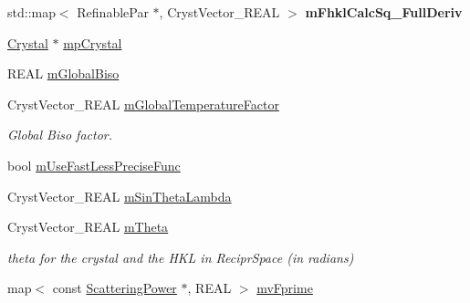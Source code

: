 \begin{DoxyCompactItemize}
\mbox{\label{class_obj_cryst_1_1_scattering_data_a7a245e07904bf0d9abdd96e2435d66ed}} 
std\+::map$<$ Refinable\+Par $\ast$, Cryst\+Vector\+\_\+\+R\+E\+AL $>$ {\bfseries m\+Fhkl\+Calc\+Sq\+\_\+\+Full\+Deriv}
\item 
\mbox{\hyperlink{class_obj_cryst_1_1_crystal}{Crystal}} $\ast$ \mbox{\hyperlink{class_obj_cryst_1_1_scattering_data_a8c4e778a97e93098d585ffdc597dbb54}{mp\+Crystal}}
\item 
R\+E\+AL \mbox{\hyperlink{class_obj_cryst_1_1_scattering_data_a15f71120c0eabe7b1bd768663a176752}{m\+Global\+Biso}}
\item 
\mbox{\label{class_obj_cryst_1_1_scattering_data_af12d3e0312ba9dc9488ca1db7f35be56}} 
Cryst\+Vector\+\_\+\+R\+E\+AL \mbox{\hyperlink{class_obj_cryst_1_1_scattering_data_af12d3e0312ba9dc9488ca1db7f35be56}{m\+Global\+Temperature\+Factor}}
\begin{DoxyCompactList}\small\item\em Global Biso factor. \end{DoxyCompactList}\item 
bool \mbox{\hyperlink{class_obj_cryst_1_1_scattering_data_a7a3fa9e9ea5c3a1dc6076f69ad584ad7}{m\+Use\+Fast\+Less\+Precise\+Func}}
\item 
Cryst\+Vector\+\_\+\+R\+E\+AL \mbox{\hyperlink{class_obj_cryst_1_1_scattering_data_a06804c1df56b267a8ecb0218e061bdb4}{m\+Sin\+Theta\+Lambda}}
\item 
\mbox{\label{class_obj_cryst_1_1_scattering_data_ae7b30bacb0d4bd5e1e54590b7567392f}} 
Cryst\+Vector\+\_\+\+R\+E\+AL \mbox{\hyperlink{class_obj_cryst_1_1_scattering_data_ae7b30bacb0d4bd5e1e54590b7567392f}{m\+Theta}}
\begin{DoxyCompactList}\small\item\em theta for the crystal and the H\+KL in Recipr\+Space (in radians) \end{DoxyCompactList}\item 
map$<$ const \mbox{\hyperlink{class_obj_cryst_1_1_scattering_power}{Scattering\+Power}} $\ast$, R\+E\+AL $>$ \mbox{\hyperlink{class_obj_cryst_1_1_scattering_data_a13e1ec375416a17f94370a4cf4bd5583}{mv\+Fprime}}
\item 
\mbox{\label{class_obj_cryst_1_1_scattering_data_a57882d7477ac1567e1c2caf72f56e9d2}} 

\end{DoxyCompactItemize}
